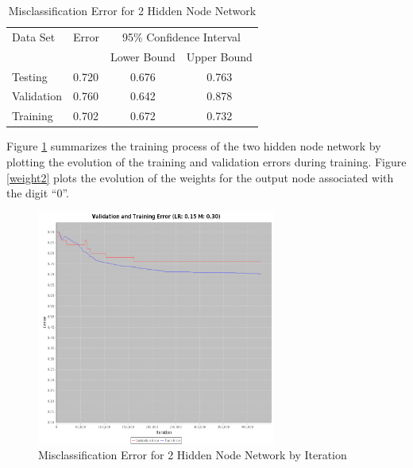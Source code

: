 \documentclass{article}
\begin{document}
\begin{table}
\caption{Misclassification Error for 2 Hidden Node Network}
\begin{center}
\begin{tabular}{llcc}
\toprule
Data Set & Error & \multicolumn{2}{c}{95\% Confidence Interval} \\
\cmidrule(r){3-4}
& & Lower Bound & Upper Bound \\
\midrule
Testing       & 0.720 &  0.676 & 0.763  \\
Validation    & 0.760 &  0.642 & 0.878  \\
Training      & 0.702 &  0.672 & 0.732  \\
\bottomrule
\end{tabular}
\label{table2}
\end{center}
\end{table}

Figure \ref{error2} summarizes the training process of the two hidden node network by plotting the evolution of the training and validation errors during training. Figure \ref{weight2} plots the evolution of the weights for the output node associated with the digit ``0''.

\begin{figure}
\centering
\includegraphics[width=0.7\textwidth]{data/final/2_hidden_node_error.png}
\caption{Misclassification Error for 2 Hidden Node Network by Iteration}
\label{error2}
\end{figure}
\end{document}
